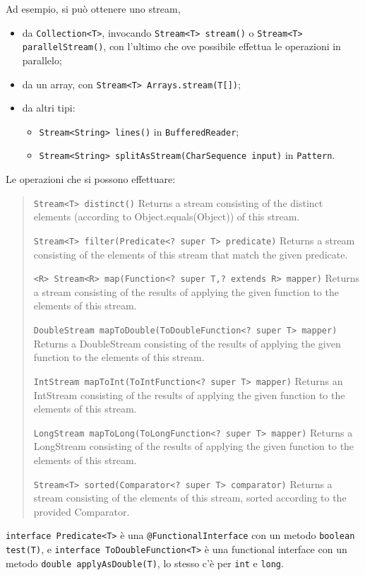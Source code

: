 \documentclass[\fontsizeclass,twocolumn]{\classname}
\theoremstyle{definition}
\theoremstyle{definition}
\begin{document}
Ad esempio, si può ottenere uno stream, 
\begin{itemize}
    \item da \texttt{Collection<T>}, invocando \texttt{Stream<T> stream()} o
        \texttt{Stream<T> pa\-ral\-lel\-Stream()}, con l'ultimo che ove possibile
        effettua le operazioni in parallelo;
    \item da un array, con \texttt{Stream<T> Arrays.stream(T[])};
    \item da altri tipi:
\begin{itemize}
    \item \texttt{Stream<String> lines()} in \texttt{BufferedReader};
    \item \texttt{Stream<String> splitAsStream(CharSequence input)} in
        \texttt{Pattern}.
\end{itemize}
\end{itemize}

Le operazioni che si possono effettuare:
\begin{quote}
    \footnotesize{\texttt{Stream<T> 	distinct()} 	Returns a stream consisting of the distinct elements (according to Object.equals(Object)) of this stream.

\texttt{Stream<T> 	filter(Predicate<? super T> predicate)} 	Returns a stream consisting of the elements of this stream that match the given predicate.

\texttt{<R> Stream<R> 	map(Function<? super T,? extends R> mapper)} 	Returns a stream consisting of the results of applying the given function to the elements of this stream.

\texttt{DoubleStream 	mapToDouble(ToDoubleFunction<? super T> mapper)} 	Returns a DoubleStream consisting of the results of applying the given function to the elements of this stream.

\texttt{IntStream 	mapToInt(ToIntFunction<? super T> mapper)} 	Returns an IntStream consisting of the results of applying the given function to the elements of this stream.

\texttt{LongStream 	mapToLong(ToLongFunction<? super T> mapper)} 	Returns a LongStream consisting of the results of applying the given function to the elements of this stream.

\texttt{Stream<T> 	sorted(Comparator<? super T> comparator)} 	Returns a stream consisting of the elements of this stream, sorted according to the provided Comparator.}
\end{quote}

\texttt{interface Predicate<T>} è una \texttt{@FunctionalInterface} con un
metodo \texttt{boolean test(T)}, e \texttt{interface ToDoubleFunction<T>} è una
functional interface con un metodo \texttt{double applyAsDouble(T)}, lo stesso
c'è per \texttt{int} e \texttt{long}.
\end{document}
